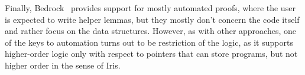 Finally, Bedrock~\cite{chlipalaMostlyautomatedVerificationLowlevel2011, chlipalaBedrockStructuredProgramming2013} provides support for mostly automated proofs, where the user is expected to write helper lemmas, but they mostly don't concern the code itself and rather focus on the data structures.
  However, as with other approaches, one of the keys to automation turns out to be restriction of the logic, as it supports higher-order logic only with respect to pointers that can store programs, but not higher order in the sense of Iris.

